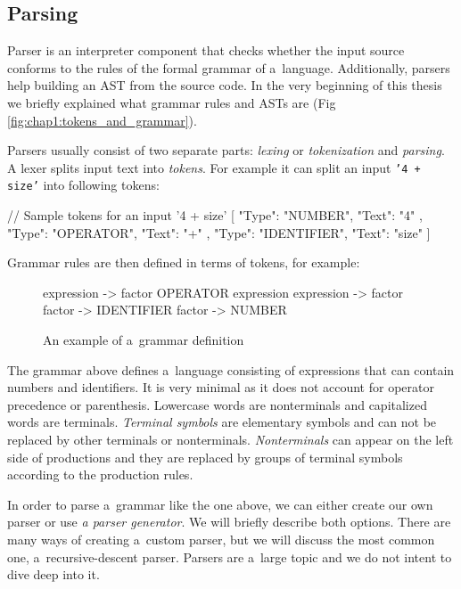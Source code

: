 \subsection{Parsing}
Parser is an interpreter component that checks whether the input source conforms to the rules of the formal grammar of a~language. Additionally, parsers help
building an AST from the source code. In the very beginning of this thesis we briefly explained what grammar rules and ASTs are
(Fig \ref{fig:chap1:tokens_and_grammar}).

Parsers usually consist of two separate parts: \emph{lexing} or \emph{tokenization} and \emph{parsing}. A lexer splits input text into \emph{tokens}.
For example it can split an input \texttt{'4 + size'} into following tokens:
\begin{code}
// Sample tokens for an input '4 + size'
[{ "Type": "NUMBER", "Text": "4" },
 { "Type": "OPERATOR", "Text": "+" },
 { "Type": "IDENTIFIER", "Text": "size" }]
\end{code}

Grammar rules are then defined in terms of tokens, for example:
\begin{figure}[!hbt]
\begin{code}
expression -> factor OPERATOR expression
expression -> factor
factor -> IDENTIFIER
factor -> NUMBER
\end{code}
    \caption{An example of a~grammar definition}
    \label{fig:chap4:grammar}
\end{figure}

The grammar above defines a~language consisting of expressions that can contain numbers and identifiers. It is very minimal as it does not account
for operator precedence or parenthesis. Lowercase words are nonterminals and capitalized words are terminals. \emph{Terminal symbols} are elementary
symbols and can not be replaced by other terminals or nonterminals. \emph{Nonterminals} can appear on the left side of productions and they are replaced by groups
of terminal symbols according to the production rules.

In order to parse a~grammar like the one above, we can either create our own parser or use \emph{a parser generator}. We will briefly describe both options.
There are many ways of creating a~custom parser, but we will discuss the most common one, a~recursive-descent parser. Parsers are a~large topic and
we do not intent to dive deep into it.

